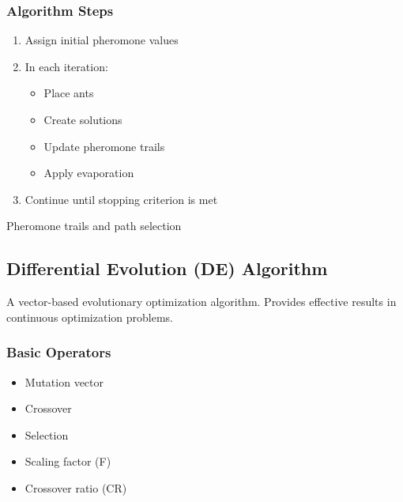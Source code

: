 \subsubsection{Algorithm Steps}
\begin{enumerate}
    \item Assign initial pheromone values
    \item In each iteration:
        \begin{itemize}
            \item Place ants
            \item Create solutions
            \item Update pheromone trails
            \item Apply evaporation
        \end{itemize}
    \item Continue until stopping criterion is met
\end{enumerate}

\begin{marginfigure}
\centering
{}
\caption{Pheromone trails and path selection}
\label{fig:aco_path}
\end{marginfigure}

\subsection{Differential Evolution (DE) Algorithm}
A vector-based evolutionary optimization algorithm. Provides effective results in continuous optimization problems.

\subsubsection{Basic Operators}
\begin{itemize}
    \item Mutation vector
    \item Crossover
    \item Selection
    \item Scaling factor (F)
    \item Crossover ratio (CR)
\end{itemize}

